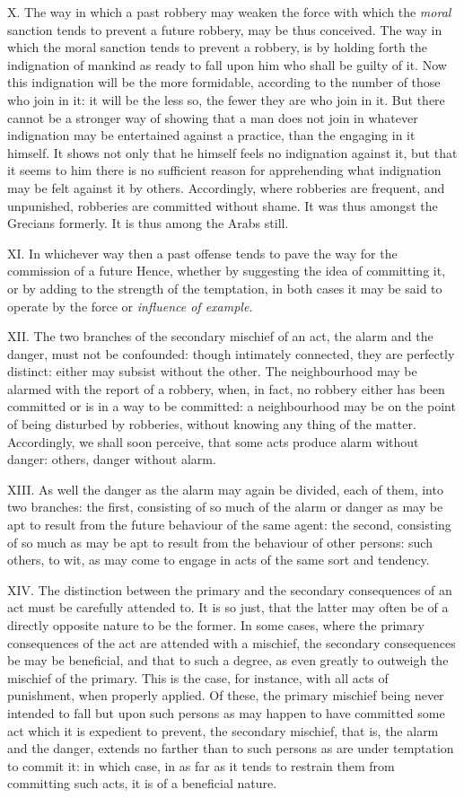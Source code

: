 \documentclass[12pt]{report}
\begin{document}
X. The way in which a past robbery may weaken the force with which the
\emph{moral} sanction tends to prevent a future robbery, may be thus
conceived. The way in which the moral sanction tends to prevent a
robbery, is by holding forth the indignation of mankind as ready to fall
upon him who shall be guilty of it. Now this indignation will be the
more formidable, according to the number of those who join in it: it
will be the less so, the fewer they are who join in it. But there cannot
be a stronger way of showing that a man does not join in whatever
indignation may be entertained against a practice, than the engaging in
it himself. It shows not only that he himself feels no indignation
against it, but that it seems to him there is no sufficient reason for
apprehending what indignation may be felt against it by others.
Accordingly, where robberies are frequent, and unpunished, robberies are
committed without shame. It was thus amongst the Grecians formerly. It
is thus among the Arabs still.

XI. In whichever way then a past offense tends to pave the way for the
commission of a future Hence, whether by suggesting the idea of
committing it, or by adding to the strength of the temptation, in both
cases it may be said to operate by the force or \emph{influence of
example.}

XII. The two branches of the secondary mischief of an act, the alarm and
the danger, must not be confounded: though intimately connected, they
are perfectly distinct: either may subsist without the other. The
neighbourhood may be alarmed with the report of a robbery, when, in
fact, no robbery either has been committed or is in a way to be
committed: a neighbourhood may be on the point of being disturbed by
robberies, without knowing any thing of the matter. Accordingly, we
shall soon perceive, that some acts produce alarm without danger:
others, danger without alarm.

XIII. As well the danger as the alarm may again be divided, each of
them, into two branches: the first, consisting of so much of the alarm
or danger as may be apt to result from the future behaviour of the same
agent: the second, consisting of so much as may be apt to result from
the behaviour of other persons: such others, to wit, as may come to
engage in acts of the same sort and tendency.

XIV. The distinction between the primary and the secondary consequences
of an act must be carefully attended to. It is so just, that the latter
may often be of a directly opposite nature to be the former. In some
cases, where the primary consequences of the act are attended with a
mischief, the secondary consequences be may be beneficial, and that to
such a degree, as even greatly to outweigh the mischief of the primary.
This is the case, for instance, with all acts of punishment, when
properly applied. Of these, the primary mischief being never intended to
fall but upon such persons as may happen to have committed some act
which it is expedient to prevent, the secondary mischief, that is, the
alarm and the danger, extends no farther than to such persons as are
under temptation to commit it: in which case, in as far as it tends to
restrain them from committing such acts, it is of a beneficial nature.
\end{document}
